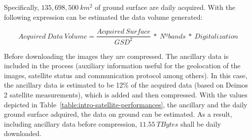 Specifically, $135,698,500~km^2$ of ground surface are daily acquired. With the
following expression can be estimated the data volume generated:

\begin{equation}
Acquired~Data~Volume= \frac{Acquired~Surface}{GSD^2}~*~Nº bands~*~Digitalization
\end{equation}

Before downloading the images they are compressed. The ancillary data is
included in the process (auxiliary information useful for the geolocation of the
images, satellite status and communication protocol among others). In this case, the ancillary data is estimated to be
12\% of the acquired data (based on Deimos 2 satellite measurements), which is
added and then compressed. With the values depicted in
Table~\ref{table:intro-satellite-performances}, the ancillary and the daily ground
surface adquired, the data on ground can be estimated. As a result, including
ancillary data before compression, $11.55~TBytes$  shall be daily downloaded.

